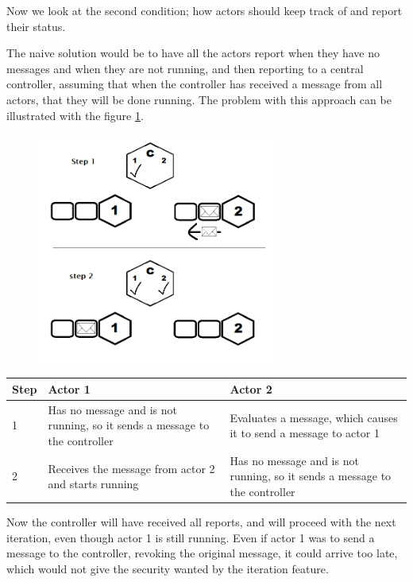 Now we look at the second condition; how actors should keep track of and report their status.

The naive solution would be to have all the actors report when they have no messages and when they are not running, and then reporting to a central controller, assuming that when the controller has received a message from all actors, that they will be done running. The problem with this approach can be illustrated with the figure \cref{iterationproblem_img}. 

\begin{figure}[htbp]
\centering
\includegraphics[width=0.7\textwidth]{Analysis/Supercomputing/iterationproblem.png}\label{iterationproblem_img}
\end{figure}

\begin{tabular}{ | p{1cm} | p{6cm} | p{6cm} | }%
\hline
Step & Actor 1 & Actor 2 \\\hline
1 & Has no message and is not running, so it sends a message to the controller & Evaluates a message, which causes it to send a message to actor 1 \\\hline
2 & Receives the message from actor 2 and starts running & Has no message and is not running, so it sends a message to the controller \\\hline
\end{tabular}

Now the controller will have received all reports, and will proceed with the next iteration, even though actor 1 is still running. Even if actor 1 was to send a message to the controller, revoking the original message, it could arrive too late, which would not give the security wanted by the iteration feature.

